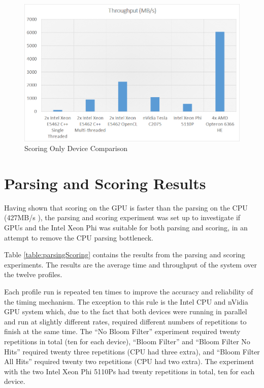 \begin{figure}[H]
\centering
\includegraphics[width=\linewidth]{images/scoringOnlyBest.png}
\caption{Scoring Only Device Comparison}
\label{fig:scoringOnlyBest}
\end{figure}

\section{Parsing and Scoring Results}

Having shown that scoring on the GPU is faster than the parsing on the CPU
(427MB/s \cite{HybridCPUFPGA}), the parsing and scoring experiment was set up
to investigate if GPUs and the Intel Xeon Phi was suitable for both parsing
and scoring, in an attempt to remove the CPU parsing bottleneck.

Table \ref{table:parsingScoring} contains the results from the parsing and
scoring experiments. The results are the average time and throughput of the
system over the twelve profiles.

Each profile run is repeated ten times to improve the accuracy and reliability
of the timing mechanism. The exception to this rule is the Intel CPU and nVidia
GPU system which, due to the fact that both devices were running in parallel and
run at slightly different rates, required different numbers of repetitions to
finish at the same time. The ``No Bloom Filter'' experiment required twenty
repetitions in total (ten for each device), ``Bloom Filter'' and ``Bloom Filter
No Hits'' required twenty three repetitions (CPU had three extra), and ``Bloom
Filter All Hits'' required twenty two repetitions (CPU had two extra). The
experiment with the two Intel Xeon Phi 5110Ps had twenty repetitions in total,
ten for each device.

